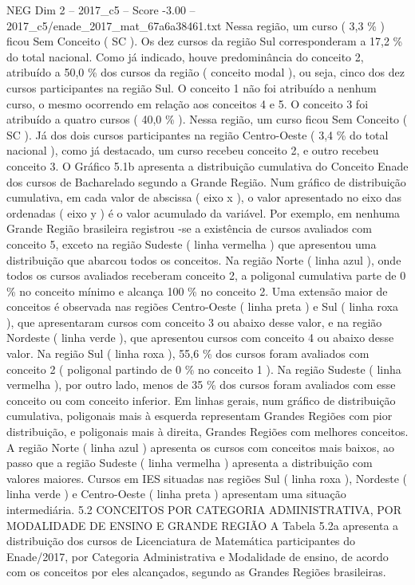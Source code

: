 \begin{textsample}{NEG Dim 2 – 2017\_c5 – Score -3.00 – 2017\_c5/enade\_2017\_mat\_67a6a38461.txt}
Nessa região, um curso ( 3,3 \% ) ficou Sem Conceito ( SC ).
Os dez cursos da região Sul corresponderam a 17,2 \% do total nacional.
Como já indicado, houve predominância do conceito 2, atribuído a 50,0 \% dos cursos da região ( conceito modal ), ou seja, cinco dos dez cursos participantes na região Sul.
O conceito 1 não foi atribuído a nenhum curso, o mesmo ocorrendo em relação aos conceitos 4 e 5.
O conceito 3 foi atribuído a quatro cursos ( 40,0 \% ).
Nessa região, um curso ficou Sem Conceito ( SC ).
Já dos dois cursos participantes na região Centro-Oeste ( 3,4 \% do total nacional ), como já destacado, um curso recebeu conceito 2, e outro recebeu conceito 3.
O Gráfico 5.1b apresenta a distribuição cumulativa do Conceito Enade dos cursos de Bacharelado segundo a Grande Região.
Num gráfico de distribuição cumulativa, em cada valor de abscissa ( eixo x ), o valor apresentado no eixo das ordenadas ( eixo y ) é o valor acumulado da variável.
Por exemplo, em nenhuma Grande Região brasileira registrou -se a existência de cursos avaliados com conceito 5, exceto na região Sudeste ( linha vermelha ) que apresentou uma distribuição que abarcou todos os conceitos.
Na região Norte ( linha azul ), onde todos os cursos avaliados receberam conceito 2, a poligonal cumulativa parte de 0 \% no conceito mínimo e alcança 100 \% no conceito 2.
Uma extensão maior de conceitos é observada nas regiões Centro-Oeste ( linha preta ) e Sul ( linha roxa ), que apresentaram cursos com conceito 3 ou abaixo desse valor, e na região Nordeste ( linha verde ), que apresentou cursos com conceito 4 ou abaixo desse valor.
Na região Sul ( linha roxa ), 55,6 \% dos cursos foram avaliados com conceito 2 ( poligonal partindo de 0 \% no conceito 1 ).
Na região Sudeste ( linha vermelha ), por outro lado, menos de 35 \% dos cursos foram avaliados com esse conceito ou com conceito inferior.
Em linhas gerais, num gráfico de distribuição cumulativa, poligonais mais à esquerda representam Grandes Regiões com pior distribuição, e poligonais mais à direita, Grandes Regiões com melhores conceitos.
A região Norte ( linha azul ) apresenta os cursos com conceitos mais baixos, ao passo que a região Sudeste ( linha vermelha ) apresenta a distribuição com valores maiores.
Cursos em IES situadas nas regiões Sul ( linha roxa ), Nordeste ( linha verde ) e Centro-Oeste ( linha preta ) apresentam uma situação intermediária. 5.2 CONCEITOS POR CATEGORIA ADMINISTRATIVA, POR MODALIDADE DE ENSINO E GRANDE REGIÃO A Tabela 5.2a apresenta a distribuição dos cursos de Licenciatura de Matemática participantes do Enade/2017, por Categoria Administrativa e Modalidade de ensino, de acordo com os conceitos por eles alcançados, segundo as Grandes Regiões brasileiras.

\end{textsample}

